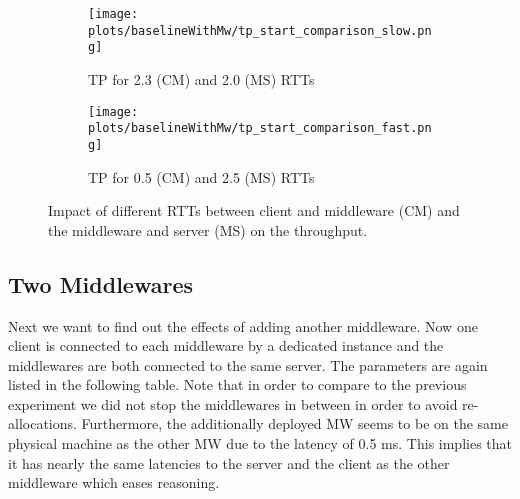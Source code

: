 \documentclass[11pt,a4paper]{article}
\begin{document}
\begin{figure}
\centering
\begin{subfigure}{.5\textwidth}
    \centering
    \texttt{[image: plots/baselineWithMw/tp\_start\_comparison\_slow.png]}
    \caption{TP for 2.3 (CM) and 2.0 (MS) RTTs}
    \label{plt:bl:one_mw_comp_slow_client}
\end{subfigure}%
\begin{subfigure}{.5\textwidth}
    \centering
    \texttt{[image: plots/baselineWithMw/tp\_start\_comparison\_fast.png]}
    \caption{TP for 0.5 (CM) and 2.5 (MS) RTTs}
    \label{plt:bl:one_mw_comp_fast_client}

\end{subfigure}
\caption{Impact of different RTTs between client and middleware (CM) and the middleware and server (MS) on the throughput.}
\label{plt:bl:one_mw_comparison}
\end{figure}



\subsection{Two Middlewares}\label{sub:bl:two_mw}

Next we want to find out the effects of adding another middleware. Now one client is connected to each middleware by a dedicated instance and the middlewares are both connected to the same server. The parameters are again listed in the following table. Note that in order to compare to the previous experiment we did not stop the middlewares in between in order to avoid re-allocations. Furthermore, the additionally deployed MW seems to be on the same physical machine as the other MW due to the latency of 0.5 ms. This implies that it has nearly the same latencies to the server and the client as the other middleware which eases reasoning.
\end{document}
